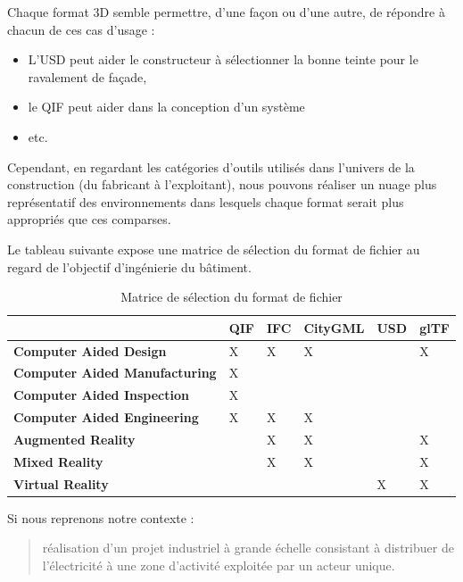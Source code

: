 Chaque format 3D semble permettre, d'une façon ou d'une autre, de répondre à chacun de ces cas d'usage :
\begin{itemize}
    \item L'USD peut aider le constructeur à sélectionner la bonne teinte pour le ravalement de façade,
    \item le QIF peut aider dans la conception d'un système
    \item etc.
\end{itemize}
\newpage
Cependant, en regardant les catégories d'outils utilisés dans l'univers de la construction (du fabricant à l'exploitant), nous pouvons réaliser un nuage plus représentatif des environnements dans lesquels chaque format serait plus appropriés que ces comparses.

Le tableau suivante expose une matrice de sélection du format de fichier au regard de l'objectif d'ingénierie du bâtiment.

\begin{table}[!h]
    \centering
    \caption{Matrice de sélection du format de fichier}
    \renewcommand{\arraystretch}{1.5} 
    \begin{tabularx}{\textwidth}{|l|X|X|X|X|X|} 
        \hline
        \rowcolor{white!75!black} \textbf{} & \textbf{QIF} & \textbf{IFC} & \textbf{CityGML} & \textbf{USD} & \textbf{glTF}\\
        \hline
        \textbf{Computer Aided Design} & X & X & X &  & X \\
        \hline
        \textbf{Computer Aided Manufacturing} & X &  &  &  &  \\
        \hline
        \textbf{Computer Aided Inspection} & X &  &  &  &  \\
        \hline
        \textbf{Computer Aided Engineering} & X & X & X &  &  \\
        \hline
        \textbf{Augmented Reality} &  & X & X &  & X \\
        \hline
        \textbf{Mixed Reality} &  & X & X &  & X \\
        \hline        
        \textbf{Virtual Reality} &  &  &  & X & X \\
        \hline
    \end{tabularx}
\end{table}

Si nous reprenons notre contexte : 
\begin{quote}
    réalisation d'un projet industriel à grande échelle consistant à distribuer de l'électricité à une zone d'activité exploitée par un acteur unique.
\end{quote}

